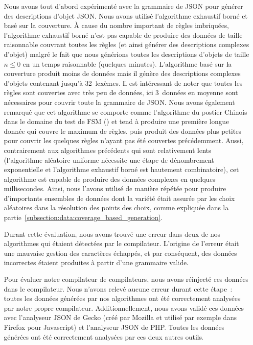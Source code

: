 Nous avons tout d'abord expérimenté avec la grammaire de JSON pour générer des
descriptions d'objet JSON. Nous avons utilisé l'algorithme exhaustif borné et
basé sur la couverture. À cause du nombre important de règles imbriquées,
l'algorithme exhaustif borné n'est pas capable de produire des données de taille
raisonnable couvrant toutes les règles (et ainsi générer des descriptions
complexes d'objet) malgré le fait que nous générions toutes les descriptions
d'objets de taille $n \leq 0$ en un temps raisonnable (quelques minutes).
L'algorithme basé sur la couverture produit moins de données mais il génère des
descriptions complexes d'objets contenant jusqu'à 32~lexèmes.  Il est
intéressant de noter que toutes les règles sont couvertes avec très peu de
données, ici 3~données en moyenne sont nécessaires pour couvrir toute la
grammaire de JSON. Nous avons également remarqué que cet algorithme se comporte
comme l'algorithme du postier Chinois dans le domaine du test de FSM
() et tend à produire une première longue
donnée qui couvre le maximum de règles, puis produit des données plus petites
pour couvrir les quelques règles n'ayant pas été couvertes précédemment. Aussi,
contrairement aux algorithmes précédents qui sont relativement lents
(l'algorithme aléatoire uniforme nécessite une étape de dénombrement
exponentielle et l'algorithme exhaustif borné est hautement combinatoire), cet
algorithme est capable de produire des données complexes en quelques
millisecondes. Ainsi, nous l'avons utilisé de manière répétée pour produire
d'importants ensembles de données dont la variété était assurée par les choix
aléatoires dans la résolution des points des choix, comme expliquée dans la
partie~\ref{subsection:data:coverage_based_generation}.

Durant cette évaluation, nous avons trouvé une erreur dans deux de nos
algorithmes qui étaient détectées par le compilateur. L'origine de l'erreur
était une mauvaise gestion des caractères échappés, et par conséquent, des
données incorrectes étaient produites à partir d'une grammaire valide.

Pour évaluer notre compilateur de compilateurs, nous avons réinjecté ces données
dans le compilateur. Nous n'avons relevé aucune erreur durant cette étape~:
toutes les données générées par nos algorithmes ont été correctement analysées
par notre propre compilateur. Additionnellement, nous avons validé ces données
avec l'analyseur JSON de Gecko (créé par Mozilla et utilisé par exemple dans
Firefox pour Javascript) et l'analyseur JSON de PHP. Toutes les données générées
ont été correctement analysées par ces deux autres outils.

